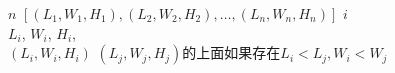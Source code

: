 \documentclass[preview]{standalone}
\begin{document}
\centering {} $n$   $[ (L_1, W_1, H_1), (L_2, W_2, H_2), \ldots , (L_n, W_n, H_n) ]$  $i$ \\  $L_i$, $W_i$, $H_i$, \\  $(L_i, W_i, H_i)$  $(L_j, W_j, H_j) \text{的上面如果存在} L_i < L_j, W_i < W_j$
\end{document}
